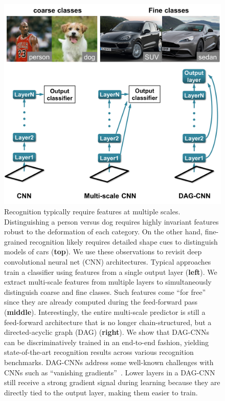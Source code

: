 \documentclass[10pt,twocolumn,letterpaper]{article}
\begin{document}
\begin{figure}[t!]
\centering
\includegraphics[width=\columnwidth]{fig/splash}
\caption{Recognition typically require features at multiple scales. Distinguishing a person versus dog requires highly invariant features robust to the deformation of each category. On the other hand, fine-grained recognition likely requires detailed shape cues to distinguish models of cars ({\bf top}). We use these observations to revisit deep convolutional neural net (CNN) architectures. Typical approaches train a classifier using features from a single output layer ({\bf left}). We extract multi-scale features from multiple layers to simultaneously distinguish coarse and fine classes. Such features come ``for free'' since they are already computed during the feed-forward pass ({\bf middle}). Interestingly, the entire multi-scale predictor is still a feed-forward architecture that is no longer chain-structured, but a directed-acyclic graph (DAG) ({\bf right}). We show that DAG-CNNs can be discriminatively trained in an end-to-end fashion, yielding state-of-the-art recognition results across various recognition benchmarks.  DAG-CNNs address some well-known challenges with CNNs such as ``vanishing gradients''~\cite{bengio1994learning}. Lower layers in a DAG-CNN still receive a strong gradient signal during learning because they are directly tied to the output layer, making them easier to train.
\label{fig:splash}}
\end{figure}
\end{document}

